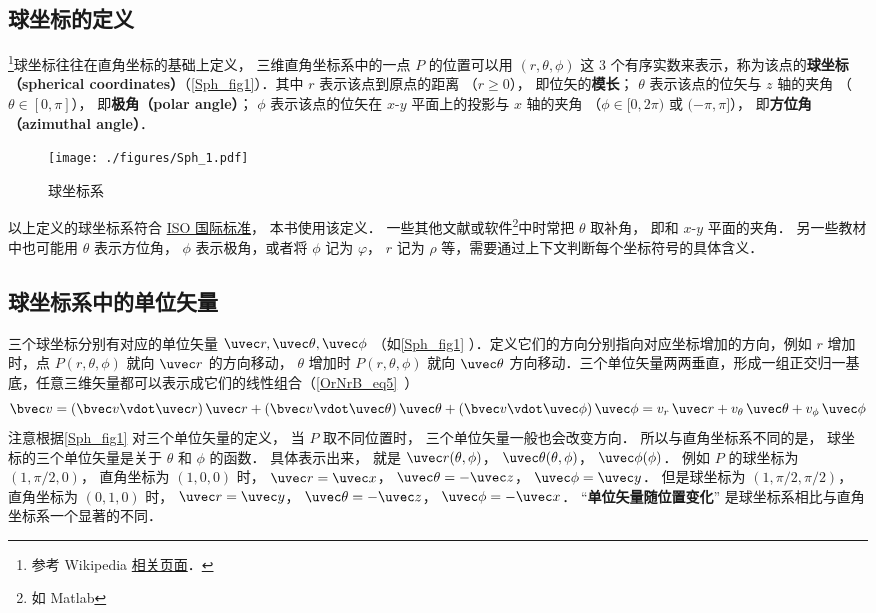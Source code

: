 

\subsection{球坐标的定义}

\footnote{参考 Wikipedia \href{https://en.wikipedia.org/wiki/Spherical_coordinate_system}{相关页面}．}球坐标往往在直角坐标的基础上定义， 三维直角坐标系中的一点 $P$ 的位置可以用 $(r,\theta ,\phi )$ 这 3 个有序实数来表示，称为该点的\textbf{球坐标（spherical coordinates）}（\autoref{Sph_fig1}）．其中 $r$ 表示该点到原点的距离 （$r \geqslant 0$）， 即位矢的\textbf{模长}； $\theta$ 表示该点的位矢与 $z$ 轴的夹角 （$\theta  \in [0,\pi]$）， 即\textbf{极角（polar angle）}； $\phi$ 表示该点的位矢在 $x$-$y$ 平面上的投影与 $x$ 轴的夹角 （$\phi  \in [0,2\pi)$ 或 $(- \pi,\pi]$）， 即\textbf{方位角（azimuthal angle）}．

\begin{figure}[ht]
\centering
\texttt{[image: ./figures/Sph\_1.pdf]}
\caption{球坐标系}\label{Sph_fig1}
\end{figure}

以上定义的球坐标系符合 \href{https://www.iso.org/standard/64973.html}{ISO 国际标准}， 本书使用该定义． 一些其他文献或软件\footnote{如 Matlab}中时常把 $\theta$ 取补角， 即和 $x$-$y$ 平面的夹角． 另一些教材中也可能用 $\theta $ 表示方位角， $\phi $ 表示极角，或者将 $\phi $ 记为 $\varphi $，  $r$ 记为 $\rho $ 等，需要通过上下文判断每个坐标符号的具体含义．

\subsection{球坐标系中的单位矢量}
三个球坐标分别有对应的单位矢量 $\uvec r, \uvec\theta, \uvec\phi$ （如\autoref{Sph_fig1} ）．定义它们的方向分别指向对应坐标增加的方向，例如 $r$ 增加时，点 $P(r,\theta ,\phi )$ 就向 $\uvec r$ 的方向移动， $\theta$ 增加时 $P(r,\theta ,\phi )$ 就向 $\uvec \theta$ 方向移动．三个单位矢量两两垂直，形成一组正交归一基底，任意三维矢量都可以表示成它们的线性组合（\autoref{OrNrB_eq5}~）
\begin{equation}\label{Sph_eq1}
\bvec v = (\bvec v \vdot \uvec r)\,\uvec r + (\bvec v \vdot \uvec \theta)\,\uvec \theta  + (\bvec v \vdot \uvec \phi)\,\uvec \phi  = v_r \,\uvec r + v_\theta \,\uvec \theta  + v_\phi \,\uvec \phi 
\end{equation}
注意根据\autoref{Sph_fig1} 对三个单位矢量的定义， 当 $P$ 取不同位置时， 三个单位矢量一般也会改变方向． 所以与直角坐标系不同的是， 球坐标的三个单位矢量是关于 $\theta$ 和 $\phi$ 的函数． 具体表示出来， 就是 $\uvec r(\theta ,\phi )$，  $\uvec \theta (\theta ,\phi )$，  $\uvec \phi (\phi )$． 
例如 $P$ 的球坐标为 $(1, \pi/2, 0)$， 直角坐标为 $(1, 0, 0)$ 时，
$\uvec r = \uvec x$， $\uvec \theta  =  - \uvec z$， $\uvec \phi  = \uvec y$． 
但是球坐标为 $(1, \pi/2, \pi/2)$， 直角坐标为 $(0, 1, 0)$ 时， $\uvec r = \uvec y$， $\uvec \theta  =  - \uvec z$， $\uvec \phi  =  - \uvec x$． “\textbf{单位矢量随位置变化}” 是球坐标系相比与直角坐标系一个显著的不同．

